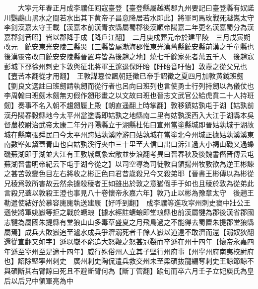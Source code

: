 　　大寜元年春正月成李驤任囘寇臺登【臺登縣屬越嶲郡九州要記曰臺登縣有奴諾川鸚鵡山黑水之間若水出其下黄帝子昌意降居若水即此】將軍司馬玫戰死越嶲太守李釗漢嘉太守王載【漢嘉本前漢青衣縣屬蜀郡後漢順帝陽嘉二年更名漢嘉蜀分為漢嘉郡釗音昭】皆以郡降于成【降戶江翻】　二月庚戍葬元帝於建平陵　三月戊寅朔改元　饒安東光安陵三縣災【三縣皆屬渤海郡惟東光漢舊縣饒安縣前漢之千童縣也後漢靈帝改曰饒安安陵縣晉置時皆為後趙之地】燒七千餘家死者萬五千人　後趙寇彭城下邳徐州刺史卞敦與征北將軍王邃退保盱眙【盱眙音吁怡】敦壼之從父兄也【壼苦本翻從才用翻】　王敦謀簒位諷朝廷徵已帝手詔徵之夏四月加敦黄鉞班劒【劉良文選註曰班劒請執劒而從行者也呂向曰班列也言使勇士行列持劒以為儀仗也李周翰曰班劒木劒無刃假作劒形畫之以文故曰班也晉志文武官公給虎賁二十人持班劒】奏事不名入朝不趨劒履上殿【朝直遥翻上時掌翻】敦移鎮姑孰屯于湖【姑孰前漢丹陽春穀縣地今太平州當塗縣即姑孰之地縣南二里有姑孰溪西入大江于湖縣本吳督農校尉治武帝太康二年分丹陽縣立于湖縣杜佑曰宣州當塗縣城即晉姑孰城于湖故城在縣南張舜民曰今太平州跨姑孰溪陸游曰姑孰城在當塗北今州城正據姑孰溪溪東南數峯如黛蓋青山也自姑孰溪行夾中三十里至大信口出口泝江過大小褐山磯又過蟂磯蕪湖即于湖並大江有王敦城氣象宏敞並步浪翻考異曰晉春秋及後魏書僭晋傳云屯蕪湖晉書明帝紀云下屯于湖今從之】以司空導為司徒敦自領揚州牧敦欲為逆王彬諫之甚苦敦變色目左右將收之彬正色曰君昔歲殺兄今又殺弟耶【晉書王彬傳以為彬從兄稜爲敦所害故云然余據殺稜者王如雖出於敦之意猶假手于如也且稜於敦為從弟此言殺兄蓋以敦殺王澄也事見八十卷懷帝永嘉六年】敦乃止以彬為豫章太守　後趙王勒遣使結好於慕容廆廆執送建康【好呼到翻】　成李驤等進攻寜州刺史褒中壯公王遜使將軍姚嶽等拒之戰於螗蜋【據水經註螗蜋即堂琅縣也前漢屬犍為郡後漢省郡國志犍為屬國朱提縣有堂狼山山多毒草盛夏之月飛鳥過之不能得去蜀置朱提郡堂狼縣屬焉】成兵大敗嶽追至瀘水成兵爭濟溺死者千餘人嶽以道遠不敢濟而還【溺奴狄翻還從宣翻又如字】遜以嶽不窮追大怒鞭之怒甚冠裂而卒遜在州十四年【懷帝永嘉四年遜至寜州至是適十四年】威行殊俗州人立其子堅行州府事【州寜州府南夷校尉府也】詔除堅寜州刺史　廣州刺史陶侃遣兵救交州未至梁碩抜龍編奪刺史王諒節諒不與碩斷其右臂諒曰死且不避斷臂何為【斷丁管翻】踰旬而卒六月壬子立妃庾氏為皇后以后兄中領軍亮為中

